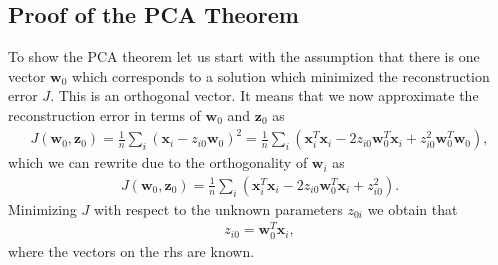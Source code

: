 \documentclass[letterpaper,10pt,english]{sphinxmanual}
\begin{document}
\subsection{Proof of the PCA Theorem}
\label{\detokenize{chapter8:proof-of-the-pca-theorem}}
To show the PCA theorem let us start with the assumption that there is one vector \(\boldsymbol{w}_0\) which corresponds to a solution which minimized the reconstruction error \(J\). This is an orthogonal vector. It means that we now approximate the reconstruction error in terms of \(\boldsymbol{w}_0\) and \(\boldsymbol{z}_0\) as
\begin{equation*}
\begin{split}
J(\boldsymbol{w}_0,\boldsymbol{z}_0)= \frac{1}{n}\sum_i (\boldsymbol{x}_i - z_{i0}\boldsymbol{w}_0)^2=\frac{1}{n}\sum_i (\boldsymbol{x}_i^T\boldsymbol{x}_i - 2z_{i0}\boldsymbol{w}_0^T\boldsymbol{x}_i+z_{i0}^2\boldsymbol{w}_0^T\boldsymbol{w}_0),
\end{split}
\end{equation*}
which we can rewrite due to the orthogonality of \(\boldsymbol{w}_i\) as
\begin{equation*}
\begin{split}
J(\boldsymbol{w}_0,\boldsymbol{z}_0)=\frac{1}{n}\sum_i (\boldsymbol{x}_i^T\boldsymbol{x}_i - 2z_{i0}\boldsymbol{w}_0^T\boldsymbol{x}_i+z_{i0}^2).
\end{split}
\end{equation*}
Minimizing \(J\) with respect to the unknown parameters \(z_{0i}\) we obtain that
\begin{equation*}
\begin{split}
z_{i0}=\boldsymbol{w}_0^T\boldsymbol{x}_i,
\end{split}
\end{equation*}
where the vectors on the rhs are known.
\end{document}
